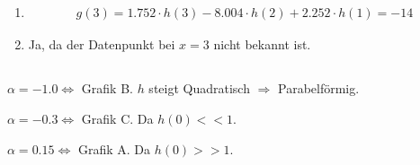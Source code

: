 \documentclass[DIN, pagenumber=false, fontsize=11pt, parskip=half]{scrartcl}
\begin{document}
    \subsection{}
    \begin{enumerate}[label=\alph*)]
        \item
            \begin{eqnarray*}
                g(3) = 1.752 \cdot  h(3) - 8.004 \cdot h(2) + 2.252 \cdot h(1) = -14 
            \end{eqnarray*}
        \item
            Ja, da der Datenpunkt bei $x=3$ nicht bekannt ist.
    \end{enumerate}

    \subsection{}
    $\alpha = -1.0 \Leftrightarrow$ Grafik B. $h$ steigt Quadratisch $\Rightarrow$ Parabelförmig.

    $\alpha = -0.3 \Leftrightarrow$ Grafik C. Da $h(0) << 1$.

    $\alpha = 0.15 \Leftrightarrow$ Grafik A. Da $h(0) >> 1$.
\end{document}
